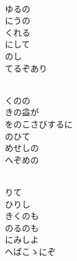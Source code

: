\documentclass[10pt,b5j]{tarticle} %
\begin{document}
\vspace{1.5em} %
\newcommand{\linespace}{0.5em} %
\newcommand{\blocksize}{0.5\hsize} %
\newcommand{\itemmargin}{6em} %
\begin{enumerate} %
    \setlength{\itemindent}{\itemmargin} %
    \begin{minipage}[c]{\blocksize}
    
        \vspace{\linespace}
        \item~\\
        ゆるの\\
        にうの\\
        くれる\\
        にして\\
        のし\\
        てるぞあり
        
        \vspace{\linespace}
        \item~\\
        くのの\\
        きの益が\\
        をのこさびするに\\
        のひて\\
        めせしの\\
        へぞめの
        
        \vspace{\linespace}
        \item~\\
        りて\\
        ひりし\\
        きくのも\\
        のるのも\\
        にみしよ\\
        へばこゝにぞ
        

\end{minipage}
\end{enumerate}
\end{document}
